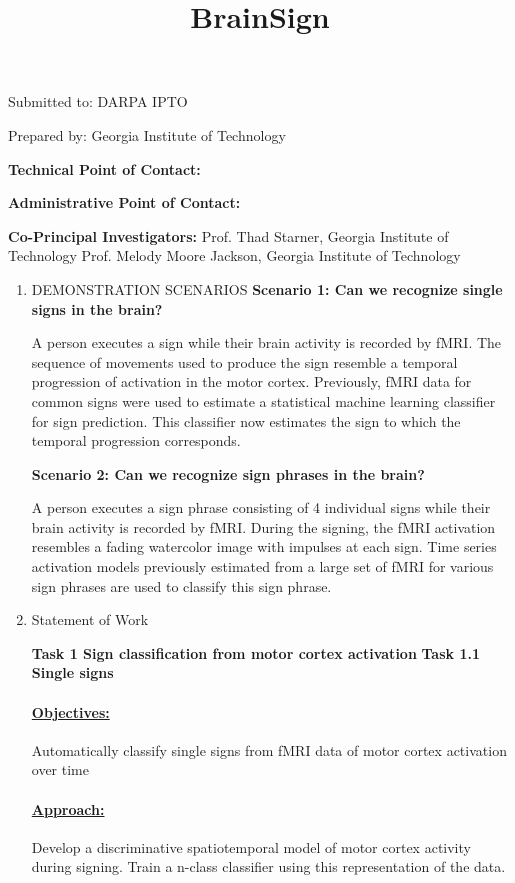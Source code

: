 \documentclass{article}
\title{BrainSign}
\begin{document}
\maketitle

Submitted to:
DARPA IPTO

Prepared by:
Georgia Institute of Technology


\textbf{Technical Point of Contact:}



\textbf{Administrative Point of Contact:}

\textbf{Co-Principal Investigators:}
Prof. Thad Starner, Georgia Institute of Technology
Prof. Melody Moore Jackson, Georgia Institute of Technology


\begin{enumerate}
 \item DEMONSTRATION SCENARIOS
   \textbf{Scenario 1: Can we recognize single signs in the brain?}

   A person executes a sign while their brain activity is recorded by fMRI. The sequence of movements used to produce the sign resemble a temporal progression of activation in the motor cortex. Previously, fMRI data for common signs were used to estimate a statistical machine learning classifier for sign prediction. This classifier now estimates the sign to which the temporal progression corresponds.

   \textbf{Scenario 2: Can we recognize sign phrases in the brain?}

   A person executes a sign phrase consisting of 4 individual signs while their brain activity is recorded by fMRI. During the signing, the fMRI activation resembles a fading watercolor image with impulses at each sign. Time series activation models previously estimated from a large set of fMRI for various sign phrases are used to classify this sign phrase.

   \item Statement of Work


     \textbf{Task 1 Sign classification from motor cortex activation}
     \textbf{Task 1.1 Single signs}
     
     \paragraph{\underline{Objectives:}}
       Automatically classify single signs from fMRI data of motor cortex activation over time
     \paragraph{\underline{Approach:}}
     Develop a discriminative spatiotemporal model of motor cortex activity during signing. Train a n-class classifier using this representation of the data.

\end{enumerate}
\end{document}
